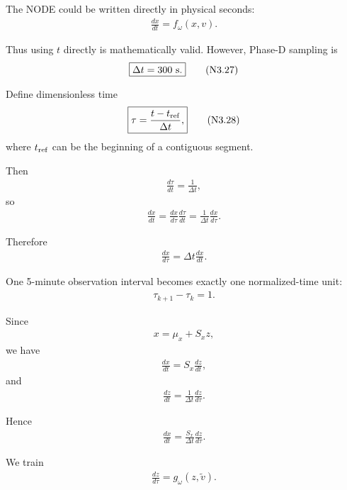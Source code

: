 \documentclass[11pt]{article}
\begin{document}
The NODE could be written directly in physical seconds:
\begin{align}
\boxed{
\frac{dx}{dt}=f_\omega(x,v).
}
\tag{N3.26}
\end{align}

Thus using \(t\) directly is mathematically valid. However, Phase-D sampling is
\begin{align}
\boxed{\Delta t=300\ {\rm s}.}
\tag{N3.27}
\end{align}

Define dimensionless time
\begin{align}
\boxed{
\tau=\frac{t-t_{\rm ref}}{\Delta t},
}
\tag{N3.28}
\end{align}
where \(t_{\rm ref}\) can be the beginning of a contiguous segment.

Then
\begin{align}
\frac{d\tau}{dt}=\frac{1}{\Delta t},
\end{align}
so
\begin{align}
\frac{dx}{dt}
=
\frac{dx}{d\tau}\frac{d\tau}{dt}
=
\frac{1}{\Delta t}\frac{dx}{d\tau}.
\end{align}

Therefore
\begin{align}
\boxed{
\frac{dx}{d\tau}
=
\Delta t\frac{dx}{dt}.
}
\tag{N3.29}
\end{align}

One 5-minute observation interval becomes exactly one normalized-time unit:
\begin{align}
\boxed{
\tau_{k+1}-\tau_k=1.
}
\tag{N3.30}
\end{align}

Since
\begin{align}
x=\mu_x+S_xz,
\end{align}
we have
\begin{align}
\frac{dx}{dt}=S_x\frac{dz}{dt},
\end{align}
and
\begin{align}
\frac{dz}{dt}
=
\frac{1}{\Delta t}\frac{dz}{d\tau}.
\end{align}

Hence
\begin{align}
\boxed{
\frac{dx}{dt}
=
\frac{S_x}{\Delta t}
\frac{dz}{d\tau}.
}
\tag{N3.31}
\end{align}

We train
\begin{align}
\boxed{
\frac{dz}{d\tau}
=
g_\omega(z,\widetilde v).
}
\tag{N3.32}
\end{align}
\end{document}
